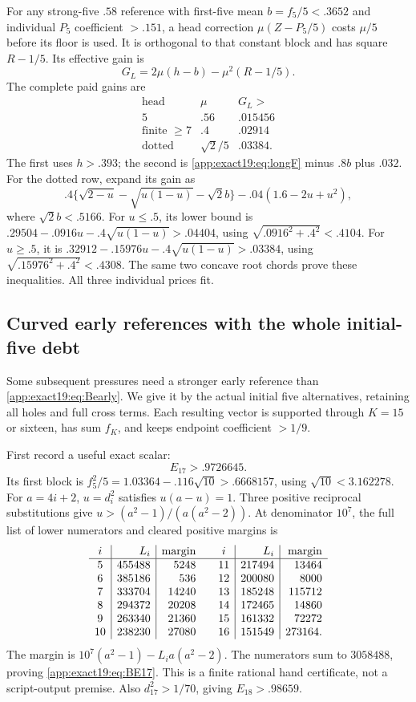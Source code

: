 \documentclass[11pt]{article}
\theoremstyle{definition}
\theoremstyle{remark}
\begin{document}
For any strong-five \(.58\)
reference with first-five mean
\(b=f_5/5<.3652\) and individual
\(P_5\) coefficient \(>.151\),
a head correction
\(\mu(Z-P_5/5)\) costs \(\mu/5\)
before its floor is used.
It is orthogonal to that constant
block and has square \(R-1/5\).
Its effective gain is
\[
                             G_L=2\mu(h-b)-\mu^2(R-1/5).
\]
The complete paid gains are
\[
\begin{array}{c|c|c}
 \text{head}&\mu&G_L>\\ \hline
 5&.56&.015456\\
 \text{finite }\ge7&.4&.02914\\
 \text{dotted}&\sqrt2/5&.03384 .
\end{array}
\tag{B19headgains}\label{app:exact19:eq:Bheadgains}
\]
The first uses \(h>.393\);
the second is
\eqref{app:exact19:eq:longF}
minus \(.8b\) plus \(.032\).
For the dotted row, expand its
gain as
\[
 .4\{\sqrt{2-u}-\sqrt{u(1-u)}-\sqrt2b\}
                                -.04(1.6-2u+u^2),
\]
where \(\sqrt2b<.5166\).
For \(u\le.5\), its lower bound is
\(.29504-.0916u-.4\sqrt{u(1-u)}>.04404\),
using \(\sqrt{.0916^2+.4^2}<.4104\).
For \(u\ge.5\), it is
\(.32912-.15976u-.4\sqrt{u(1-u)}>.03384\),
using \(\sqrt{.15976^2+.4^2}<.4308\).
The same two concave root chords
prove these inequalities.
All three individual prices fit.

\subsection{Curved early references with the whole initial-five debt}
\label{app:exact19:Bcurvedearly}

Some subsequent pressures need a
stronger early reference than
\eqref{app:exact19:eq:Bearly}.
We give it by the actual initial
five alternatives, retaining all
holes and full cross terms.
Each resulting vector is supported
through \(K=15\) or sixteen,
has sum \(f_K\), and keeps endpoint
coefficient \(>1/9\).

First record a useful exact scalar:
\[
                              E_{17}>.9726645 .
\tag{B19E17}\label{app:exact19:eq:BE17}
\]
Its first block is
\(f_5^2/5=1.03364-.116\sqrt{10}>.6668157\),
using \(\sqrt{10}<3.162278\).
For \(a=4i+2\),
\(u=d_i^2\) satisfies \(u(a-u)=1\).
Three positive reciprocal
substitutions give
\(u>(a^2-1)/(a(a^2-2))\).
At denominator \(10^7\), the full
list of lower numerators and
cleared positive margins is
\[
\begin{array}{c|r|r@{\qquad}c|r|r}
 i&L_i&\text{margin}&i&L_i&\text{margin}\\ \hline
5&455488&5248&11&217494&13464\\
6&385186&536&12&200080&8000\\
7&333704&14240&13&185248&115712\\
8&294372&20208&14&172465&14860\\
9&263340&21360&15&161332&72272\\
10&238230&27080&16&151549&273164 .
\end{array}
\]
The margin is
\(10^7(a^2-1)-L_i a(a^2-2)\).
The numerators sum to \(3058488\),
proving \eqref{app:exact19:eq:BE17}.
This is a finite rational hand
certificate, not a script-output
premise.
Also \(d_{17}^2>1/70\), giving
\(E_{18}>.98659\).
\end{document}

